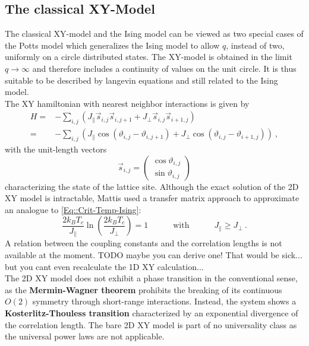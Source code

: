	\subsection{The classical XY-Model}
	The classical XY-model and the Ising model can be viewed as two special cases of the Potts model \cite{potts1952some} which generalizes the Ising model to allow $q$, instead of two, uniformly on a circle distributed states. The XY-model is obtained in the limit $q \rightarrow \infty$ and therefore includes a continuity of values on the unit circle. It is thus suitable to be described by langevin equations and still related to the Ising model. \\
	
	The XY hamiltonian with nearest neighbor interactions is given by
	\begin{equation}
		\begin{split}
			H =&- \sum_{i,j}^{} \left(J_\parallel \vec{s}_{i,j} \vec{s}_{i,j + 1} + J_\perp  \vec{s}_{i,j} \vec{s}_{i + 1,j} \right)   \\
			=&- \sum_{i,j}^{} \left(J_\parallel  \cos \left(\vartheta_{i,j} - \vartheta_{i, j+1} \right) + J_\perp  \cos \left(\vartheta_{i,j} - \vartheta_{i+1, j} \right) \right)	 ~,
		\end{split}
	\end{equation}
	with the unit-length vectors
	\begin{equation}
		\vec{s}_{i, j} =	\left(\begin{array}{c}
			\cos \vartheta_{i, j} \\
			\sin \vartheta_{i, j}
		\end{array}\right)
	\end{equation}
	characterizing the state of the lattice site. Although the exact solution of the 2D XY model is intractable, Mattis \cite{mattis1984transfer} used a transfer matrix approach to approximate an analogue to \autoref{Eq::Crit-Temp-Ising}:
	\begin{equation} \label{Eq::Crit-Temp-XY}
		\frac{2 k_B T_c}{J_\parallel} \ln \left(\frac{2 k_B T_c}{J_\perp}\right) =	1 \quad \qquad \text{with} \qquad \quad J_\parallel \geq J_\perp~.
	\end{equation}
	A relation between the coupling constants and the correlation lengths is not available at the moment. TODO maybe you can derive one! That would be sick... but you cant even recalculate the 1D XY calculation... \\
	
	The 2D XY model does not exhibit a phase transition in the conventional sense, as the \textbf{Mermin-Wagner theorem} \cite{mermin1966absence} prohibits the breaking of its continuous $O(2)$ symmetry through short-range interactions. Instead, the system shows a \textbf{Kosterlitz-Thouless transition} \cite{JMKosterlitz_1973, berezinskii1971destruction} characterized by an exponential divergence of the correlation length. The bare 2D XY model is part of no universality class as the universal power laws are not applicable. \\
	

